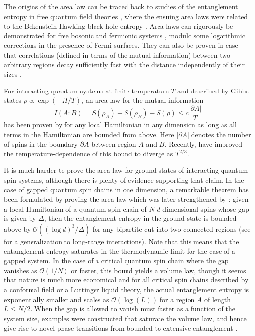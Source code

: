 \documentclass[rmp,aps,reprint,superscriptaddress,nobalancelastpage]{revtex4-1}
\begin{document}
The origins of the area law can be traced back to studies of the entanglement entropy in free quantum field theories \cite{holzhey1994geometric}, where the ensuing area laws were related to the Bekenstein-Hawking black hole entropy \cite{bekenstein1973black}. Area laws can rigorously be demonstrated for free bosonic \cite{plenio2005entropy} and fermionic systems \cite{wolf:fermion-arealaw,gioev2006entanglement}, modulo some logarithmic corrections in the presence of Fermi surfaces. They can also be proven in case that  correlations (defined in terms of the mutual information) between two arbitrary regions decay sufficiently fast with the distance independently of their sizes \cite{wolf:mutual-info-arealaw}.

For interacting quantum systems at finite temperature $T$ and described by Gibbs states $\rho\propto \exp(-H/T)$, an area law for the mutual information
\[
    I(A:B)=S(\rho_{A})+S(\rho_{B})-S(\rho)\le c\frac{|\partial A|}{T}
\]
has been proven by \citet{wolf:mutual-info-arealaw} for any local Hamiltonian in any dimension as long as all terms in the Hamiltonian are bounded from above. Here $|\partial A|$ denotes the number of spins in the boundary $\partial A$ between region $A$ and $B$. Recently, \citet{kuwahara:thermal-area-law} have improved the temperature-dependence of this bound to diverge as $T^{2/3}$.

It is much harder to prove the area law for ground states of interacting quantum spin systems, although there is plenty of evidence supporting that claim. In the case of gapped quantum spin chains in one dimension, a remarkable theorem has been formulated by
\citet{hastings:arealaw}
proving the area law which was later strengthened by
\citet*{arad:1d-arealaw}:
given a local Hamiltonian of a quantum spin chain of $N$ $d$-dimensional spins whose gap is  given by $\Delta$, then the entanglement entropy in the ground state is bounded above by $\mathcal{O}\left((\log d)^3/\Delta\right)$ for any bipartite cut into two connected regions (see \citet{kuwahara:1d-longrange-arealaw} for a generalization to long-range interactions). Note that this means that the entanglement entropy saturates in the thermodynamic limit for the case of a gapped system.  In the case of a critical quantum spin chain where the gap vanishes as $\mathcal{O}(1/N)$ or faster, this bound yields a volume law, though it seems that nature is much more economical and for all critical spin chains described by a conformal field or a Luttinger liquid theory, the actual entanglement entropy is exponentially smaller and scales as $\mathcal{O}(\log(L))$ for a region $A$ of length $L\le N/2$. When the gap is allowed to vanish must faster as a function of the system size, examples were constructed that saturate the volume law, and hence give rise to novel phase transitions from bounded to extensive entanglement \cite{movassagh2016supercritical,zhang2017novel}.
\end{document}
